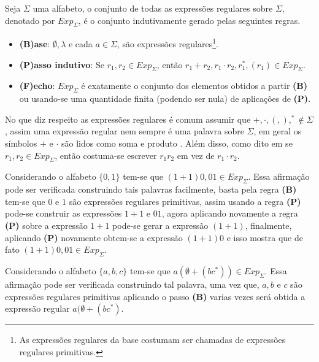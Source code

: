 \begin{definicao}\label{def:ExpRegularesSintaxe}
	Seja $\Sigma$ uma alfabeto, o conjunto de todas as expressões regulares sobre $\Sigma$, denotado por $Exp_\Sigma$, é o conjunto indutivamente gerado pelas seguintes regras.
	\begin{itemize}
		\item[ ]\textbf{(B)ase}: $\emptyset, \lambda$ e cada $a \in \Sigma$, são expressões regulares\footnote{As expressões regulares da base costumam ser chamadas de expressões regulares primitivas.}.
		\item[ ]\textbf{(P)asso indutivo}:  Se $r_1, r_2 \in Exp_\Sigma$, então $r_1 + r_2, r_1 \cdot r_2, r_1^*, (r_1) \in Exp_\Sigma$.
		\item[ ]\textbf{(F)echo}: $Exp_\Sigma$ é exatamente o conjunto dos elementos obtidos a partir \textbf{(B)} ou usando-se uma quantidade finita (podendo ser nula) de aplicações de \textbf{(P)}.
	\end{itemize}
\end{definicao}

No que diz respeito as expressões regulares é comum assumir que $+, \cdot, (, ), ^* \notin \Sigma$, assim uma expressão regular nem sempre é uma palavra sobre $\Sigma$, em geral os símbolos $+$ e $\cdot$ são lidos como soma e produto \cite{carroll1989}. Além disso, como dito em \cite{benjaLivro2010} se $r_1, r_2 \in Exp_\Sigma$, então costuma-se escrever $r_1r_2$ em vez de $r_1 \cdot r_2$.

\begin{exemplo}
	Considerando o alfabeto $\{0,1\}$ tem-se que $(1 + 1)0, 01 \in Exp_\Sigma$. Essa afirmação pode ser verificada construindo tais palavras facilmente, basta pela regra \textbf{(B)} tem-se que  $0$ e $1$ são expressões regulares primitivas, assim usando a regra \textbf{(P)} pode-se construir as expressões $1 + 1$ e $01$, agora aplicando novamente a regra \textbf{(P)} sobre a expressão $1 + 1$ pode-se gerar a expressão $(1 + 1)$, finalmente, aplicando \textbf{(P)} novamente obtem-se a expressão $(1+1)0$ e isso mostra que de fato $(1 + 1)0, 01 \in Exp_\Sigma$.
\end{exemplo}

\begin{exemplo}
	Considerando o alfabeto $\{a, b, c\}$ tem-se que $a(\emptyset + (bc^*)) \in Exp_\Sigma$. Essa afirmação pode ser verificada construindo tal palavra, uma vez que, $a, b$ e $c$ são expressões regulares primitivas aplicando o passo \textbf{(B)} varias vezes será obtida a expressão regular $a(\emptyset + (bc^*)$.
\end{exemplo}

